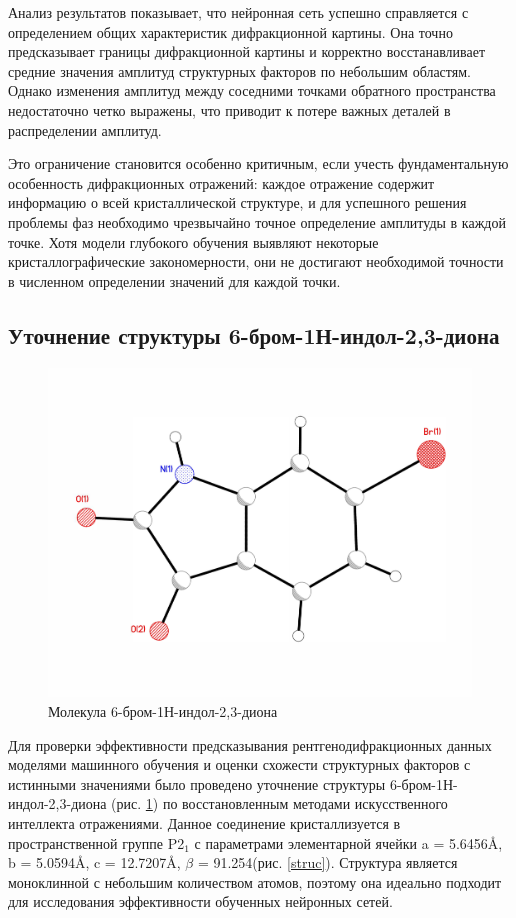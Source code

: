 Анализ результатов показывает, что нейронная сеть успешно справляется с определением общих характеристик дифракционной картины. Она точно предсказывает границы дифракционной картины и корректно восстанавливает средние значения амплитуд структурных факторов по небольшим областям. Однако изменения амплитуд между соседними точками обратного пространства недостаточно четко выражены, что приводит к потере важных деталей в распределении амплитуд. 

Это ограничение становится особенно критичным, если учесть фундаментальную особенность дифракционных отражений: каждое отражение содержит информацию о всей кристаллической структуре, и для успешного решения проблемы фаз необходимо чрезвычайно точное определение амплитуды в каждой точке. Хотя модели глубокого обучения выявляют некоторые кристаллографические закономерности, они не достигают необходимой точности в численном определении значений для каждой точки.





\subsection{Уточнение структуры 6-бром-1Н-индол-2,3-диона}

\begin{figure}[H]
	\centering
	\includegraphics[width=1\textwidth]{figures/vid.pdf}
	\caption{Молекула 6-бром-1Н-индол-2,3-диона}
	\label{vid}
\end{figure}


Для проверки эффективности предсказывания рентгенодифракционных данных моделями машинного обучения и оценки схожести структурных факторов с истинными значениями было проведено уточнение структуры 6-бром-1Н-индол-2,3-диона (рис. \ref{vid}) по восстановленным методами искусственного интеллекта отражениями. Данное соединение кристаллизуется в пространственной группе P2$_1$ с параметрами элементарной ячейки a = 5.6456\AA, b = 5.0594\AA, c = 12.7207\AA, $\beta$ = 91.254\degree (рис. \ref{struc}). Структура является моноклинной с небольшим количеством атомов, поэтому она идеально подходит для исследования эффективности обученных нейронных сетей.


